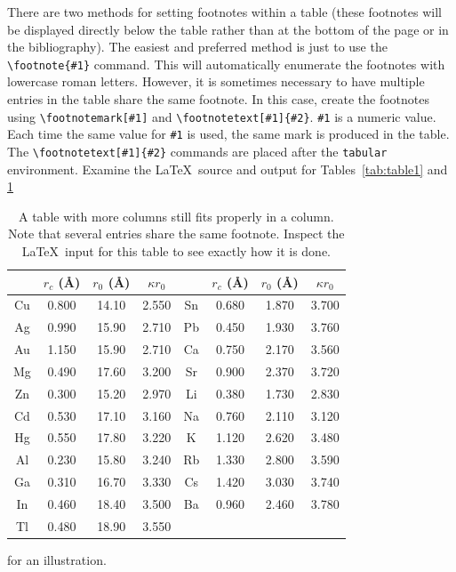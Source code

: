 \documentclass[%
 aip,
 amsmath,amssymb,
preprint,%
]{revtex4-1}
\begin{document}
There are two methods for setting footnotes within a table (these
footnotes will be displayed directly below the table rather than at
the bottom of the page or in the bibliography).
The easiest
and preferred method is just to use the \verb+\footnote{#1}+
command. This will automatically enumerate the footnotes with
lowercase roman letters.
However, it is sometimes necessary to have
multiple entries in the table share the same footnote.
In this case,
create the footnotes using
\verb+\footnotemark[#1]+ and \verb+\footnotetext[#1]{#2}+.
\texttt{\#1} is a numeric value.
Each time the same value for \texttt{\#1} is used, 
the same mark is produced in the table. 
The \verb+\footnotetext[#1]{#2}+ commands are placed after the \texttt{tabular}
environment. 
Examine the \LaTeX\ source and output for Tables~\ref{tab:table1} and 
\ref{tab:table2}%
\begin{table}
\caption{\label{tab:table2}A table with more columns still fits
properly in a column. Note that several entries share the same
footnote. Inspect the \LaTeX\ input for this table to see
exactly how it is done.}
\begin{ruledtabular}
\begin{tabular}{cccccccc}
 &$r_c$ (\AA)&$r_0$ (\AA)&$\kappa r_0$&
 &$r_c$ (\AA) &$r_0$ (\AA)&$\kappa r_0$\\
\hline
Cu& 0.800 & 14.10 & 2.550 &Sn\footnotemark[1]
& 0.680 & 1.870 & 3.700 \\
Ag& 0.990 & 15.90 & 2.710 &Pb\footnotemark[2]
& 0.450 & 1.930 & 3.760 \\
Au& 1.150 & 15.90 & 2.710 &Ca\footnotemark[3]
& 0.750 & 2.170 & 3.560 \\
Mg& 0.490 & 17.60 & 3.200 &Sr\footnotemark[4]
& 0.900 & 2.370 & 3.720 \\
Zn& 0.300 & 15.20 & 2.970 &Li\footnotemark[2]
& 0.380 & 1.730 & 2.830 \\
Cd& 0.530 & 17.10 & 3.160 &Na\footnotemark[5]
& 0.760 & 2.110 & 3.120 \\
Hg& 0.550 & 17.80 & 3.220 &K\footnotemark[5]
&  1.120 & 2.620 & 3.480 \\
Al& 0.230 & 15.80 & 3.240 &Rb\footnotemark[3]
& 1.330 & 2.800 & 3.590 \\
Ga& 0.310 & 16.70 & 3.330 &Cs\footnotemark[4]
& 1.420 & 3.030 & 3.740 \\
In& 0.460 & 18.40 & 3.500 &Ba\footnotemark[5]
& 0.960 & 2.460 & 3.780 \\
Tl& 0.480 & 18.90 & 3.550 & & & & \\
\end{tabular}
\end{ruledtabular}
\end{table}
for an illustration. 
\end{document}
